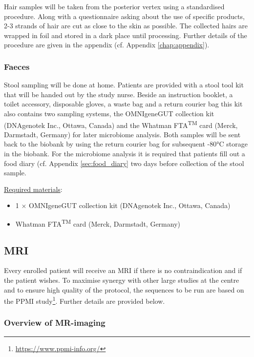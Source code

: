 Hair samples will be taken from the posterior vertex using a standardised procedure. Along with a questionnaire asking about the use of specific products, 2-3 strands of hair are cut as close to the skin as possible. The collected hairs are wrapped in foil and stored in a dark place until processing. Further details of the procedure are given in the appendix (cf. Appendix \ref{chap:appendix}).

\subsubsection{Faeces}
Stool sampling will be done at home. Patients are provided with a stool tool kit that will be handed out by the study nurse. Beside an instruction booklet, a toilet accessory, disposable gloves, a waste bag and a return courier bag this kit also contains two sampling systems, the OMNIgeneGUT\regd{} collection kit (DNAgenotek Inc., Ottawa, Canada) and the Whatman FTA\textsuperscript{TM} card (Merck, Darmstadt, Germany) for later microbiome analysis. Both samples will be sent back to the biobank by using the return courier bag for subsequent -80°C storage in the biobank. For the microbiome analysis it is required that patients fill out a food diary (cf. Appendix \ref{sec:food_diary} two days before collection of the stool sample.

\noindent \underline{Required materials}:
\begin{itemize}
  \item 1 $\times$ OMNIgeneGUT\regd{} collection kit
        (DNAgenotek Inc., Ottawa, Canada)
  \item Whatman FTA\textsuperscript{TM} card (Merck, Darmstadt, Germany)
\end{itemize}

\subsection{\ac{MRI}}
\label{subsec:MRI}
Every enrolled patient will receive an \ac{MRI} if there is no contraindication and if the patient wishes. To maximise synergy with other large studies at the centre and to ensure high quality of the protocol, the sequences to be run are based on the \ac{PPMI} study\footnote{\url{https://www.ppmi-info.org/}}. Further details are provided below.
\subsubsection{Overview of MR-imaging}

